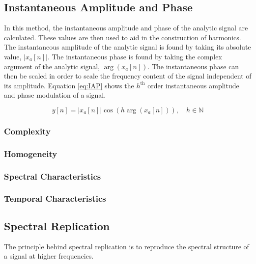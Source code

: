 	\subsection{Instantaneous Amplitude and Phase}
	\label{sec:Excitation-IAP}
		In this method, the instantaneous amplitude and phase of the analytic signal are calculated. These values
		are then used to aid in the construction of harmonics. The instantaneous amplitude of the analytic signal
		is found by taking its absolute value, $|x_{a}[n]|$. The instantaneous phase is found by taking the complex
		argument of the analytic signal, $\arg(x_{a}[n])$. The instantaneous phase can then be scaled in order to
		scale the frequency content of the signal independent of its amplitude. Equation \ref{eq:IAP} shows the
		$h^{\text{th}}$ order instantaneous amplitude and phase modulation of a signal.

		\begin{equation}
			y[n] = |x_{a}[n]| \cos \left( h\arg(x_{a}[n]) \right), \quad h \in \mathbb{N}
			\label{eq:IAP}
		\end{equation}

		\subsubsection*{Complexity}
		\subsubsection*{Homogeneity}
		\subsubsection*{Spectral Characteristics}
		\subsubsection*{Temporal Characteristics}

	\subsection{Spectral Replication}
	\label{sec:Excitation-SpectralReplication}
		The principle behind spectral replication is to reproduce the spectral structure of a signal at higher
		frequencies.

